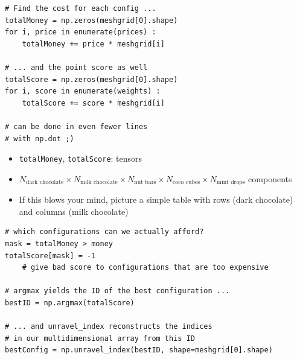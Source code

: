 \begin{frame}[fragile]
%
\begin{tcbraster}[raster columns=2,
                  raster equal height,
                  nobeforeafter,
                  raster column skip=0.5cm]
\begin{codebox}
\begin{verbatim}
# Find the cost for each config ...
totalMoney = np.zeros(meshgrid[0].shape)
for i, price in enumerate(prices) :
    totalMoney += price * meshgrid[i]

# ... and the point score as well
totalScore = np.zeros(meshgrid[0].shape)
for i, score in enumerate(weights) :
    totalScore += score * meshgrid[i]

# can be done in even fewer lines
# with np.dot ;)
\end{verbatim}
\end{codebox}
%
\begin{tcolorbox}[title=Elements in Code]
\begin{itemize}
\item \texttt{totalMoney}, \texttt{totalScore}: tensors
\item $N_{\text{dark chocolate}} \times N_{\text{milk chocolate}} \times N_{\text{nut bars}} \times N_{\text{coco cubes}} \times N_{\text{mint drops}}$ components
\item If this blows your mind, picture a simple table with rows (dark chocolate) and columns (milk chocolate)
\end{itemize}
\end{tcolorbox}
\end{tcbraster}
%
\end{frame}


\begin{frame}[fragile]
%
\begin{codebox}
\begin{verbatim}
# which configurations can we actually afford?
mask = totalMoney > money
totalScore[mask] = -1
    # give bad score to configurations that are too expensive

# argmax yields the ID of the best configuration ...
bestID = np.argmax(totalScore)

# ... and unravel_index reconstructs the indices
# in our multidimensional array from this ID
bestConfig = np.unravel_index(bestID, shape=meshgrid[0].shape)
\end{verbatim}
\end{codebox}
%
\end{frame}

